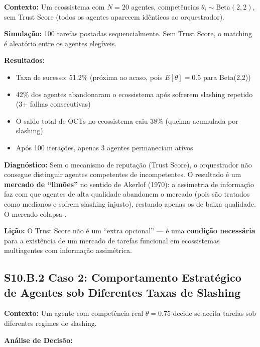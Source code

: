 \textbf{Contexto:} Um ecossistema com $N=20$ agentes, competências $\theta_i \sim \text{Beta}(2,2)$, sem Trust Score (todos os agentes aparecem idênticos ao orquestrador).

\textbf{Simulação:} 100 tarefas postadas sequencialmente. Sem Trust Score, o matching é aleatório entre os agentes elegíveis.

\textbf{Resultados:}
\begin{itemize}
    \item Taxa de sucesso: 51.2\% (próxima ao acaso, pois $E[\theta] = 0.5$ para Beta(2,2))
    \item 42\% dos agentes abandonaram o ecossistema após sofrerem slashing repetido (3+ falhas consecutivas)
    \item O saldo total de OCTs no ecossistema caiu 38\% (queima acumulada por slashing)
    \item Após 100 iterações, apenas 3 agentes permaneciam ativos
\end{itemize}

\textbf{Diagnóstico:} Sem o mecanismo de reputação (Trust Score), o orquestrador não consegue distinguir agentes competentes de incompetentes. O resultado é um \textbf{mercado de ``limões''} no sentido de Akerlof (1970): a assimetria de informação faz com que agentes de alta qualidade abandonem o mercado (pois são tratados como medianos e sofrem slashing injusto), restando apenas os de baixa qualidade. O mercado colapsa \cite{akerlof1970market}.

\textbf{Lição:} O Trust Score não é um ``extra opcional'' --- é uma \textbf{condição necessária} para a existência de um mercado de tarefas funcional em ecossistemas multiagentes com informação assimétrica.

\subsection*{S10.B.2 Caso 2: Comportamento Estratégico de Agentes sob Diferentes Taxas de Slashing}

\textbf{Contexto:} Um agente com competência real $\theta = 0.75$ decide se aceita tarefas sob diferentes regimes de slashing.

\textbf{Análise de Decisão:}

